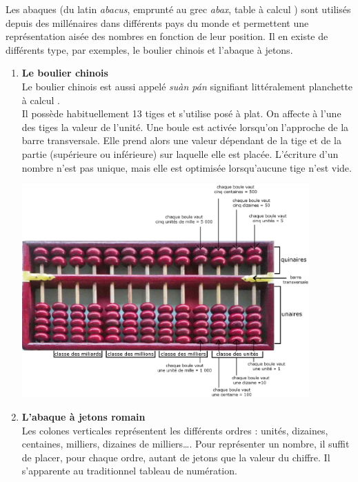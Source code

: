 \bigskip


\begin{exercice*}
Les abaques (du latin {\it abacus}, emprunté au grec {\it abax}, \og table à calcul \fg) sont utilisés depuis des millénaires dans différents pays du monde et permettent une représentation aisée des nombres en fonction de leur position. Il en existe de différents type, par exemples, le boulier chinois et l'abaque à jetons.
\begin{enumerate}
   \item {\bf Le boulier chinois} \\
   Le boulier chinois est aussi appelé {\it su\`an p\'an} signifiant littéralement \og planchette à calcul \fg. \\
   Il possède habituellement 13 tiges et s’utilise posé à plat. On affecte à l'une des tiges la valeur de l'unité. Une boule est activée lorsqu'on l’approche de la barre transversale. Elle prend alors une valeur dépendant de la tige et de la partie (supérieure ou inférieure) sur laquelle elle est placée. L'écriture d'un nombre n'est pas unique, mais elle est optimisée lorsqu'aucune tige n'est vide.
   \begin{center}
      \includegraphics[width=11cm]{Nombres_et_calculs_did/Images/Num1_activites_boulier}
   \end{center}  
   \item {\bf L'abaque à jetons romain} \\
   Les colones verticales représentent les différents ordres : unités, dizaines, centaines, milliers, dizaines de milliers\dots. Pour représenter un nombre, il suffit de placer, pour chaque ordre, autant de jetons que la valeur du chiffre. Il s'apparente au traditionnel tableau de numération. \\

\end{enumerate}
\end{exercice*}
